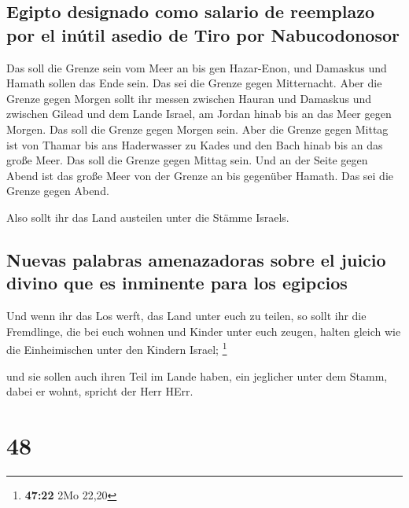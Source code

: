 \hypertarget{egipto-designado-como-salario-de-reemplazo-por-el-inuxfatil-asedio-de-tiro-por-nabucodonosor}{%
\subsection{Egipto designado como salario de reemplazo por el inútil
asedio de Tiro por
Nabucodonosor}\label{egipto-designado-como-salario-de-reemplazo-por-el-inuxfatil-asedio-de-tiro-por-nabucodonosor}}

 Das soll die Grenze sein vom Meer an bis gen Hazar-Enon,
und Damaskus und Hamath sollen das Ende sein. Das sei die Grenze gegen
Mitternacht.  Aber die Grenze gegen Morgen sollt ihr
messen zwischen Hauran und Damaskus und zwischen Gilead und dem Lande
Israel, am Jordan hinab bis an das Meer gegen Morgen. Das soll die
Grenze gegen Morgen sein.  Aber die Grenze gegen Mittag
ist von Thamar bis ans Haderwasser zu Kades und den Bach hinab bis an
das große Meer. Das soll die Grenze gegen Mittag sein. 
Und an der Seite gegen Abend ist das große Meer von der Grenze an bis
gegenüber Hamath. Das sei die Grenze gegen Abend.

 Also sollt ihr das Land austeilen unter die Stämme
Israels.

\hypertarget{nuevas-palabras-amenazadoras-sobre-el-juicio-divino-que-es-inminente-para-los-egipcios}{%
\subsection{Nuevas palabras amenazadoras sobre el juicio divino que es
inminente para los
egipcios}\label{nuevas-palabras-amenazadoras-sobre-el-juicio-divino-que-es-inminente-para-los-egipcios}}

 Und wenn ihr das Los werft, das Land unter euch zu
teilen, so sollt ihr die Fremdlinge, die bei euch wohnen und Kinder
unter euch zeugen, halten gleich wie die Einheimischen unter den Kindern
Israel; \footnote{\textbf{47:22} 2Mo 22,20}

 und sie sollen auch ihren Teil im Lande haben, ein
jeglicher unter dem Stamm, dabei er wohnt, spricht der Herr HErr.

\hypertarget{section-47}{%
\section{48}\label{section-47}}

